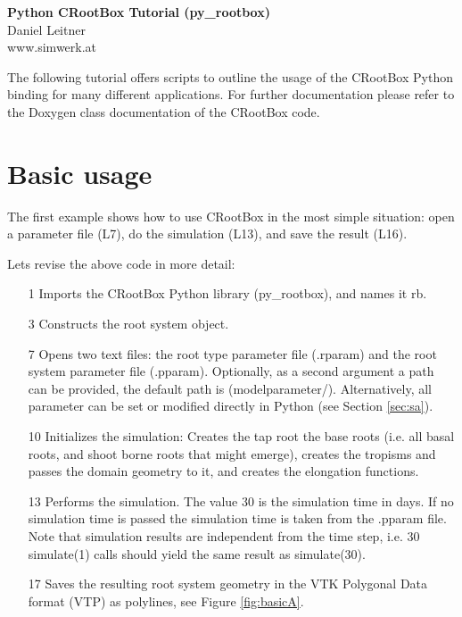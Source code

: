 \documentclass[a4paper]{article}
\begin{document}
\begin{center}
\vspace{0.5 cm}
\huge{\textbf{Python CRootBox Tutorial (py\_rootbox)}} \\
\vspace{0.5 cm}
\normalsize
Daniel Leitner \\
www.simwerk.at 
\end{center}

\vspace{0.5 cm}

\noindent 
The following tutorial offers scripts to outline the usage of the CRootBox Python binding for many different applications. 
For further documentation please refer to the Doxygen class documentation of the CRootBox code.


\vspace{0.5 cm}

\tableofcontents

\newpage



\section{Basic usage}
 
The first example shows how to use CRootBox in the most simple situation: open a parameter file (L7), do the simulation (L13), and save the result (L16). 


\noindent 
Lets revise the above code in more detail: 
\begin{itemize}
 \item[1] Imports the CRootBox Python library (py\_rootbox), and names it rb.
 \item[3] Constructs the root system object.
 \item[7] Opens two text files: the root type parameter file (.rparam) and the root system parameter file (.pparam). Optionally, as a second argument a path can be provided, the default path is (modelparameter/). 
 Alternatively, all parameter can be set or modified directly in Python (see Section \ref{sec:sa}).
 \item[10] Initializes the simulation: Creates the tap root the base roots (i.e. all basal roots, and shoot borne roots that might emerge), creates the tropisms and passes the domain geometry to it, and creates the elongation functions. 
 \item[13] Performs the simulation. The value 30 is the simulation time in days. If no simulation time is passed the simulation time is taken from the .pparam file. Note that simulation results are independent from the time step, 
 i.e. 30 simulate(1) calls should yield the same result as simulate(30). 
 \item[17] Saves the resulting root system geometry in the VTK Polygonal Data format (VTP) as polylines, see Figure \ref{fig:basicA}. 
\end{itemize}
\end{document}

